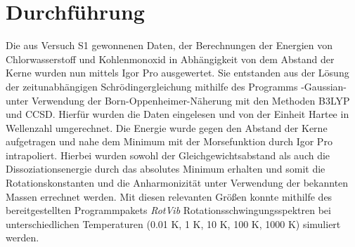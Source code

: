 
 
%
\section{Durchführung}
Die aus Versuch S1 gewonnenen Daten, der Berechnungen der Energien von Chlorwasserstoff und Kohlenmonoxid in Abhängigkeit von dem Abstand der Kerne wurden nun mittels Igor Pro ausgewertet. Sie entstanden aus der Lösung der zeitunabhängigen Schrödingergleichung mithilfe des Programms -Gaussian- unter Verwendung der Born-Oppenheimer-Näherung mit den Methoden B3LYP und CCSD. 
Hierfür wurden die Daten eingelesen und von der Einheit Hartee in Wellenzahl umgerechnet. Die Energie wurde gegen den Abstand der Kerne aufgetragen und nahe dem Minimum mit der Morsefunktion durch Igor Pro intrapoliert. Hierbei wurden sowohl der Gleichgewichtsabstand als auch die Dissoziationsenergie durch das absolutes Minimum erhalten und somit die Rotationskonstanten und die Anharmonizität unter Verwendung der bekannten Massen errechnet werden. Mit diesen relevanten Größen konnte mithilfe des bereitgestellten Programmpakets \textit{RotVib} Rotationsschwingungsspektren bei unterschiedlichen Temperaturen (0.01 K, 1 K, 10 K, 100 K, 1000 K) simuliert werden. 
%